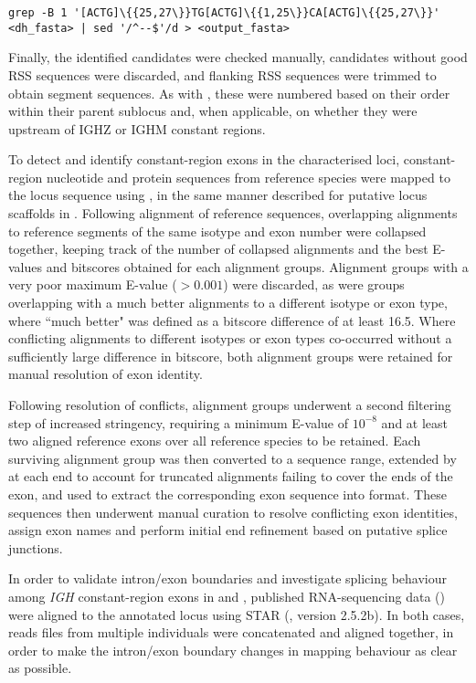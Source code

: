 \begin{lstlisting}
grep -B 1 '[ACTG]\{{25,27\}}TG[ACTG]\{{1,25\}}CA[ACTG]\{{25,27\}}' <dh_fasta> | sed '/^--$'/d > <output_fasta>
\end{lstlisting}

Finally, the identified \dh candidates were checked manually, candidates without good RSS sequences were discarded, and flanking RSS sequences were trimmed to obtain \dh segment sequences. As with \jh, these were numbered based on their order within their parent sublocus and, when applicable, on whether they were upstream of IGHZ or IGHM constant regions.


To detect and identify constant-region exons in the characterised loci, constant-region nucleotide and protein sequences from reference species were mapped to the locus sequence using  \parencite{altschul1990blast,altschul1997blast}, in the same manner described for putative locus scaffolds in .
Following alignment of reference sequences, overlapping alignments to reference segments of the same isotype and exon number were collapsed together, keeping track of the number of collapsed alignments and the best E-values and bitscores obtained for each alignment groups. Alignment groups with a very poor maximum E-value ($> 0.001$) were discarded, as were groups overlapping with a much better alignments to a different isotype or exon type, where ``much better" was defined as a bitscore difference of at least 16.5. Where conflicting alignments to different isotypes or exon types co-occurred without a sufficiently large difference in bitscore, both alignment groups were retained for manual resolution of exon identity.

Following resolution of conflicts, alignment groups underwent a second filtering step of increased stringency, requiring a minimum E-value of $10^{-8}$ and at least two aligned reference exons over all reference species to be retained. Each surviving alignment group was then converted to a sequence range, extended by  at each end to account for truncated alignments failing to cover the ends of the exon, and used to extract the corresponding exon sequence into  format. These sequences then underwent manual curation to resolve conflicting exon identities, assign exon names and perform initial end refinement based on putative splice junctions.

In order to validate intron/exon boundaries and investigate splicing behaviour among \textit{IGH} constant-region exons in \Nfu and \Xma, published RNA-sequencing data () were aligned to the annotated locus using STAR (\parencite{dobin2013star}, version 2.5.2b). In both cases, reads files from multiple individuals were concatenated and aligned together, in order to make the intron/exon boundary changes in mapping behaviour as clear as possible. %

